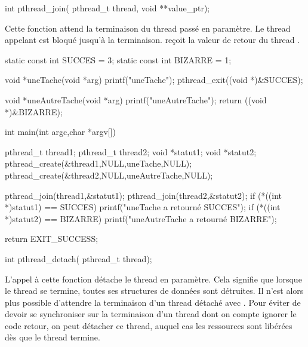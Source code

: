 \label{func:pthread_join}

\begin{codeblock}
int pthread_join(
    pthread_t thread,
    void **value_ptr);
\end{codeblock}

Cette fonction attend la terminaison du thread passé en paramètre. Le thread appelant est bloqué jusqu'à la terminaison.  reçoit la valeur de retour du thread .

\begin{codeblock}
static const int SUCCES = 3;
static const int BIZARRE = 1;

void *uneTache(void *arg) {
  printf("uneTache\n");
  pthread_exit((void *)&SUCCES);
}

void *uneAutreTache(void *arg) {
  printf("uneAutreTache\n");
  return ((void *)&BIZARRE);
}

int main(int argc,char *argv[])
{
  pthread_t thread1;
  pthread_t thread2;
  void *statut1;
  void *statut2;
  pthread_create(&thread1,NULL,uneTache,NULL);
  pthread_create(&thread2,NULL,uneAutreTache,NULL);

  pthread_join(thread1,&statut1);
  pthread_join(thread2,&statut2);
  if (*((int *)statut1) == SUCCES)
    printf("uneTache a retourné SUCCES\n");
  if (*((int *)statut2) == BIZARRE)
    printf("uneAutreTache a retourné BIZARRE\n");

  return EXIT_SUCCESS;
}
\end{codeblock}

\label{func:pthread_detach}

\begin{codeblock}
int pthread_detach(
    pthread_t thread);
\end{codeblock}

L'appel à cette fonction détache le thread en paramètre. Cela signifie que lorsque le thread se termine, toutes ses structures de données sont détruites. Il n'est alors plus possible d'attendre la terminaison d'un thread détaché avec . Pour éviter de devoir se synchroniser sur la terminaison d'un thread dont on compte ignorer le code retour, on peut détacher ce thread, auquel cas les ressources sont libérées dès que le thread termine.

